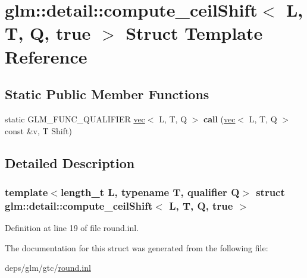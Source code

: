 \hypertarget{structglm_1_1detail_1_1compute__ceilShift_3_01L_00_01T_00_01Q_00_01true_01_4}{}\section{glm\+:\+:detail\+:\+:compute\+\_\+ceil\+Shift$<$ L, T, Q, true $>$ Struct Template Reference}
\label{structglm_1_1detail_1_1compute__ceilShift_3_01L_00_01T_00_01Q_00_01true_01_4}
\subsection*{Static Public Member Functions}
\begin{DoxyCompactItemize}
\item 
\mbox{\label{structglm_1_1detail_1_1compute__ceilShift_3_01L_00_01T_00_01Q_00_01true_01_4_a0e2262617f657d648f33fb98d6eca5c7}} 
static G\+L\+M\+\_\+\+F\+U\+N\+C\+\_\+\+Q\+U\+A\+L\+I\+F\+I\+ER \hyperlink{structglm_1_1vec}{vec}$<$ L, T, Q $>$ {\bfseries call} (\hyperlink{structglm_1_1vec}{vec}$<$ L, T, Q $>$ const \&v, T Shift)
\end{DoxyCompactItemize}


\subsection{Detailed Description}
\subsubsection*{template$<$length\+\_\+t L, typename T, qualifier Q$>$\newline
struct glm\+::detail\+::compute\+\_\+ceil\+Shift$<$ L, T, Q, true $>$}



Definition at line 19 of file round.\+inl.



The documentation for this struct was generated from the following file\+:\begin{DoxyCompactItemize}
\item 
deps/glm/gtc/\hyperlink{round_8inl}{round.\+inl}\end{DoxyCompactItemize}
